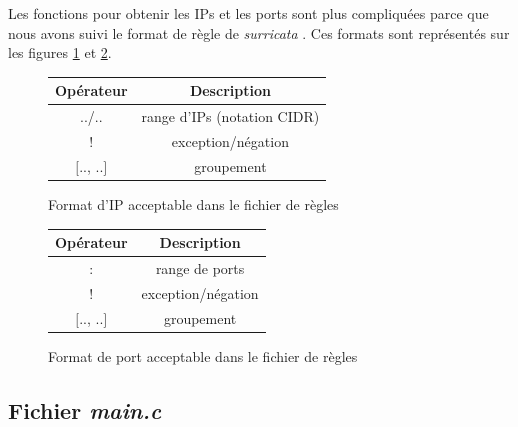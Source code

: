 \documentclass[a4paper]{article}
\begin{document}
Les fonctions pour obtenir les IPs et les ports sont plus compliquées parce que nous avons suivi le format de règle de \textit{surricata} \cite{2}. Ces formats sont représentés sur les figures \ref{fig:formatip} et \ref{fig:formatport}.
\begin{figure}[H]
    \centering
    \begin{tabular}{|c|c|} \hline
        \textbf{Opérateur} & \textbf{Description} \\ \hline
        ../.. & range d'IPs (notation CIDR) \\
        ! & exception/négation \\
        $[$.., ..$]$ & groupement \\ \hline
    \end{tabular}
    \caption{Format d'IP acceptable dans le fichier de règles}
    \label{fig:formatip}
\end{figure}
\begin{figure}[H]
    \centering
    \begin{tabular}{|c|c|} \hline
        \textbf{Opérateur} & \textbf{Description} \\ \hline
        : & range de ports \\
        ! & exception/négation \\
        $[$.., ..$]$ & groupement \\ \hline
    \end{tabular}
    \caption{Format de port acceptable dans le fichier de règles}
    \label{fig:formatport}
\end{figure}





\subsection{Fichier \textit{main.c}}
\end{document}
